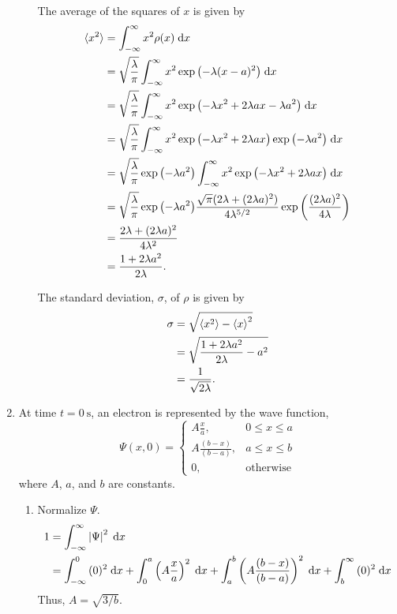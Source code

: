 \documentclass[a4paper, 12pt]{config/homework}
\begin{document}
\begin{enumerate}
\begin{enumerate}[label=(\alph*)]
The average of the squares of \(x\) is given by
\begin{align*}
\braket{x^2} &= \bint{-\infty}{\infty}{x^2 \rho(x)}{x}
\\&= \sqrt{\frac{\lambda}{\pi}} \bint{-\infty}{\infty}{x^2 \exp{\left(-\lambda(x-a)^2\right)}}{x}
\\&= \sqrt{\frac{\lambda}{\pi}} \bint{-\infty}{\infty}{x^2 \exp{\left(-\lambda x^2 +2\lambda ax - \lambda a^2\right)}}{x}
\\&= \sqrt{\frac{\lambda}{\pi}} \bint{-\infty}{\infty}{x^2 \exp{\left(-\lambda x^2 + 2\lambda a x\right)}\exp{\left(-\lambda a^2\right)}}{x}
\\&= \sqrt{\frac{\lambda}{\pi}} \exp{\left(-\lambda a^2\right)} \bint{-\infty}{\infty}{x^2 \exp{\left(-\lambda x^2 + 2\lambda a x\right)}}{x}
\\&= \sqrt{\frac{\lambda}{\pi}} \exp{\left(-\lambda a^2\right)} \frac{\sqrt{\pi} (2\lambda + (2\lambda a)^2)}{4 \lambda^{5/2}} \exp{\left(\frac{(2\lambda a)^2}{4\lambda}\right)}
\\&= \frac{2\lambda + (2\lambda a)^2}{4\lambda^2}
\\&= \frac{1 + 2\lambda a^2}{2\lambda}.
\end{align*}

The standard deviation, \(\sigma \), of \(\rho \) is given by
\begin{align*}
\sigma &= \sqrt{\braket{x^2} - \braket{x}^2}
\\&= \sqrt{\frac{1 + 2\lambda a^2}{2\lambda} - a^2}
\\&= \frac{1}{\sqrt{2\lambda}}.
\end{align*}
\end{enumerate}

\pagebreak
\item At time \(t=\qty{0}{\second}\), an electron is represented by the wave function,
\[\Psi(x, 0) = \begin{cases}
    A\frac{x}{a}, & 0 \le x \le a \\
    A \frac{(b-x)}{(b-a)}, & a \le x \le b \\
    0, & \text{otherwise}
\end{cases}\]
where \(A\), \(a\), and \(b\) are constants.
\begin{enumerate}[label=(\alph*)]
\item Normalize \(\Psi \).
\begin{align*}
1 &= \bint{-\infty}{\infty}{\left| \Psi \right|^2}{x}
\\&= \bint{-\infty}{0}{(0)^2}{x} + \bint{0}{a}{\left(A \frac{x}{a}\right)^2}{x} + \bint{a}{b}{\left(A\frac{(b-x)}{(b-a)}\right)^2}{x} + \bint{b}{\infty}{(0)^2}{x}
\end{align*}
Thus, \(A = \sqrt{3/b}\).


\end{enumerate}
\end{enumerate}
\end{document}
